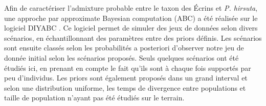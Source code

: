 Afin de caractériser l'admixture probable entre le taxon des Écrins et \textit{P. hirsuta}, une approche par approximate Bayesian computation (ABC) a été réalisée sur le logiciel DIYABC \cite{Cornuet2014}. 
Ce logiciel permet de simuler des jeux de données selon divers scénarios, en échantillonnant des paramètres entre des priors définis. 
Les scénarios sont ensuite classés selon les probabilités a posteriori d'observer notre jeu de donnée initial selon les scénarios proposés. 
Seuls quelques scénarios ont été étudiés ici, en prenant en compte le fait qu'ils sont à chaque fois supportés par peu d'individus. 
Les priors sont également proposés dans un grand interval et selon une distribution uniforme, les temps de divergence entre populations et taille de population n'ayant pas été étudiés sur le terrain.
